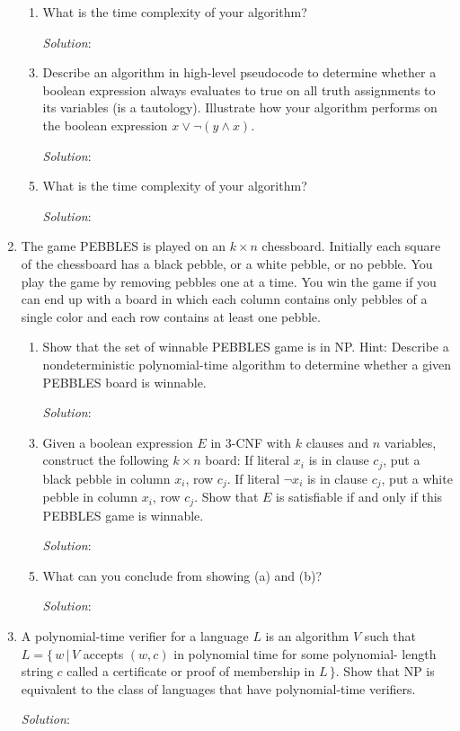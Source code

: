 \documentclass[]{article}
\begin{document}
\begin{enumerate}
\begin{enumerate}
\item What is the time complexity of your algorithm?
\item[\emph{Solution}:]

\item Describe an algorithm in high-level pseudocode to determine whether a
boolean expression always evaluates to true on all truth assignments to its
variables (is a tautology). Illustrate how your algorithm performs on the
boolean expression $x \vee \neg (y \wedge x)$.
\item[\emph{Solution}:]

\item What is the time complexity of your algorithm?
\item[\emph{Solution}:]

\end{enumerate}

\item The game PEBBLES is played on an $k \times n$ chessboard. Initially each
square of the chessboard has a black pebble, or a white pebble, or no pebble.
You play the game by removing pebbles one at a time. You win the game if you can
end up with a board in which each column contains only pebbles of a single color
and each row contains at least one pebble.
\begin{enumerate}
\item Show that the set of winnable PEBBLES game is in NP. Hint: Describe a
nondeterministic polynomial-time algorithm to  determine whether a given PEBBLES
board is winnable.
\item[\emph{Solution}:]

\item Given a boolean expression $E$ in 3-CNF with $k$ clauses and $n$
variables, construct the following $k \times n$ board: If literal $x_i$ is in
clause $c_j$, put a black pebble in column $x_i$, row $c_j$. If literal $\neg
x_i$ is in clause $c_j$, put a white pebble in column $x_i$, row $c_j$. Show
that $E$ is satisfiable if and only if this PEBBLES game is winnable.
\item[\emph{Solution}:]

\item What can you conclude from showing (a) and (b)?
\item[\emph{Solution}:]
\end{enumerate}

\item A polynomial-time verifier for a language $L$ is an algorithm $V$ such
that $L = \{\,w\,|\,V$ accepts $(w,c)$ in polynomial time for some polynomial-
length string $c$ called a certificate or proof of membership in $L\,\}$. Show
that NP is equivalent to the class of languages that have polynomial-time
verifiers.
\item[\emph{Solution}:]


\end{enumerate}
\end{document}
